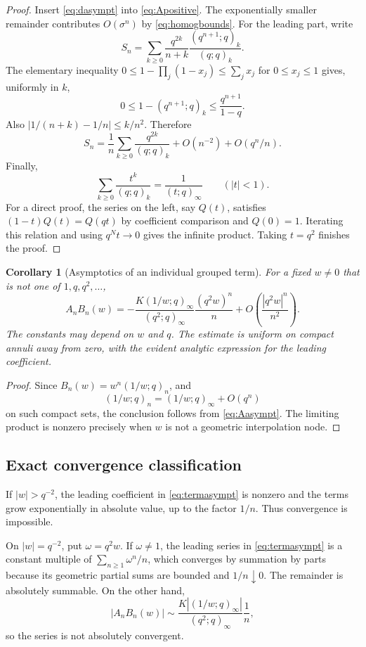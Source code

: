 \documentclass[11pt,letterpaper]{article}
\newtheorem{corollary}[theorem]{Corollary}
\theoremstyle{definition}\newtheorem{definition}[theorem]{Definition}
\theoremstyle{remark}\newtheorem{remark}[theorem]{Remark}
\numberwithin{equation}{section}
\begin{document}
\begin{proof}
Insert \eqref{eq:dasympt} into \eqref{eq:Apositive}. The exponentially smaller remainder contributes $O(\sigma^n)$ by \eqref{eq:homogbounds}. For the leading part, write
\[
 S_n=\sum_{k\geq0}\frac{q^{2k}}{n+k}\frac{(q^{n+1};q)_k}{(q;q)_k}.
\]
The elementary inequality $0\leq1-\prod_j(1-x_j)\leq\sum_jx_j$ for $0\leq x_j\leq1$ gives, uniformly in $k$,
\[
 0\leq1-(q^{n+1};q)_k\leq\frac{q^{n+1}}{1-q}.
\]
Also $|1/(n+k)-1/n|\leq k/n^2$. Therefore
\[
 S_n=\frac1n\sum_{k\geq0}\frac{q^{2k}}{(q;q)_k}
 +O(n^{-2})+O(q^n/n).
\]
Finally,
\begin{equation}\label{eq:eulerq}
 \sum_{k\geq0}\frac{t^k}{(q;q)_k}=\frac1{(t;q)_\infty}\qquad(|t|<1).
\end{equation}
For a direct proof, the series on the left, say $Q(t)$, satisfies $(1-t)Q(t)=Q(qt)$ by coefficient comparison and $Q(0)=1$. Iterating this relation and using $q^Nt\to0$ gives the infinite product. Taking $t=q^2$ finishes the proof.
\end{proof}

\begin{corollary}[Asymptotics of an individual grouped term]\label{cor:term}
For a fixed $w\neq0$ that is not one of $1,q,q^2,\ldots$,
\begin{equation}\label{eq:termasympt}
 A_nB_n(w)=
 -\frac{K(1/w;q)_\infty}{(q^2;q)_\infty}
 \frac{(q^2w)^n}{n}
 +O\left(\frac{|q^2w|^n}{n^2}\right).
\end{equation}
The constants may depend on $w$ and $q$. The estimate is uniform on compact annuli away from zero, with the evident analytic expression for the leading coefficient.
\end{corollary}
\begin{proof}
Since $B_n(w)=w^n(1/w;q)_n$, and
\[
 (1/w;q)_n=(1/w;q)_\infty+O(q^n)
\]
on such compact sets, the conclusion follows from \eqref{eq:Aasympt}. The limiting product is nonzero precisely when $w$ is not a geometric interpolation node.
\end{proof}

\subsection{Exact convergence classification}
If $|w|>q^{-2}$, the leading coefficient in \eqref{eq:termasympt} is nonzero and the terms grow exponentially in absolute value, up to the factor $1/n$. Thus convergence is impossible.

On $|w|=q^{-2}$, put $\omega=q^2w$. If $\omega\neq1$, the leading series in \eqref{eq:termasympt} is a constant multiple of $\sum_{n\geq1}\omega^n/n$, which converges by summation by parts because its geometric partial sums are bounded and $1/n\downarrow0$. The remainder is absolutely summable. On the other hand,
\[
 |A_nB_n(w)|\sim
 \frac{K|(1/w;q)_\infty|}{(q^2;q)_\infty}\frac1n,
\]
so the series is not absolutely convergent.
\end{document}
